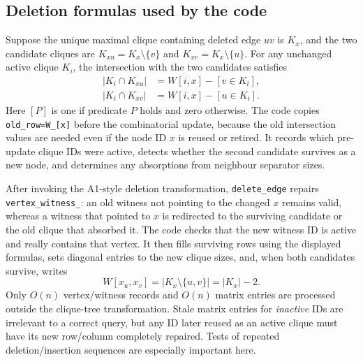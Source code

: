 \subsection{Deletion formulas used by the code}
Suppose the unique maximal clique containing deleted edge \(uv\) is \(K_x\), and the two candidate cliques are \(K_{xu}=K_x\setminus\{v\}\) and \(K_{xv}=K_x\setminus\{u\}\).  For any unchanged active clique \(K_i\), the intersection with the two candidates satisfies
\begin{align*}
|K_i\cap K_{xu}| &= W[i,x]-[v\in K_i],\\
|K_i\cap K_{xv}| &= W[i,x]-[u\in K_i].
\end{align*}
Here \([P]\) is one if predicate \(P\) holds and zero otherwise.  The code copies \texttt{old\_row=W\_[x]} before the combinatorial update, because the old intersection values are needed even if the node ID \(x\) is reused or retired.  It records which pre-update clique IDs were active, detects whether the second candidate survives as a new node, and determines any absorptions from neighbour separator sizes.

After invoking the A1-style deletion transformation, \texttt{delete\_edge} repairs \texttt{vertex\_witness\_}: an old witness not pointing to the changed \(x\) remains valid, whereas a witness that pointed to \(x\) is redirected to the surviving candidate or the old clique that absorbed it.  The code checks that the new witness ID is active and really contains that vertex.  It then fills surviving rows using the displayed formulas, sets diagonal entries to the new clique sizes, and, when both candidates survive, writes
\[
 W[x_u,x_v]=|K_x\setminus\{u,v\}|=|K_x|-2.
\]
Only \(O(n)\) vertex/witness records and \(O(n)\) matrix entries are processed outside the clique-tree transformation.  Stale matrix entries for \emph{inactive} IDs are irrelevant to a correct query, but any ID later reused as an active clique must have its new row/column completely repaired.  Tests of repeated deletion/insertion sequences are especially important here.

